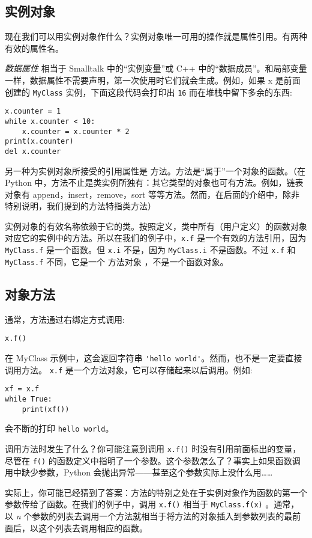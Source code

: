 \subsection{实例对象}
现在我们可以用实例对象作什么？实例对象唯一可用的操作就是属性引用。有两种有效的属性名。

\textit{数据属性} 相当于 Smalltalk 中的“实例变量”或 C++ 中的“数据成员”。和局部变量一样，数据属性不需要声明，第一次使用时它们就会生成。例如，如果 x 是前面创建的 \texttt{MyClass} 实例，下面这段代码会打印出 \verb|16| 而在堆栈中留下多余的东西:
\begin{lstlisting}
x.counter = 1
while x.counter < 10:
    x.counter = x.counter * 2
print(x.counter)
del x.counter
\end{lstlisting}
另一种为实例对象所接受的引用属性是 方法。方法是“属于”一个对象的函数。（在 Python 中，方法不止是类实例所独有：其它类型的对象也可有方法。例如，链表对象有 append，insert，remove，sort 等等方法。然而，在后面的介绍中，除非特别说明，我们提到的方法特指类方法）

实例对象的有效名称依赖于它的类。按照定义，类中所有（用户定义）的函数对象对应它的实例中的方法。所以在我们的例子中，\texttt{x.f} 是一个有效的方法引用，因为 \texttt{MyClass.f} 是一个函数。但 \texttt{x.i} 不是，因为 \texttt{MyClass.i} 不是函数。不过 \texttt{x.f} 和 \texttt{MyClass.f} 不同，它是一个 方法对象 ，不是一个函数对象。
\subsection{对象方法}
通常，方法通过右绑定方式调用:
\begin{lstlisting}
x.f()
\end{lstlisting}
在 MyClass 示例中，这会返回字符串 \verb|'hello world'|。然而，也不是一定要直接调用方法。 \texttt{x.f} 是一个方法对象，它可以存储起来以后调用。例如:
\begin{lstlisting}
xf = x.f
while True:
    print(xf())
\end{lstlisting}
会不断的打印 \verb|hello world|。

调用方法时发生了什么？你可能注意到调用 \texttt{x.f()} 时没有引用前面标出的变量，尽管在 \texttt{f()} 的函数定义中指明了一个参数。这个参数怎么了？事实上如果函数调用中缺少参数，Python 会抛出异常——甚至这个参数实际上没什么用……

实际上，你可能已经猜到了答案：方法的特别之处在于实例对象作为函数的第一个参数传给了函数。在我们的例子中，调用 \texttt{x.f()} 相当于 \texttt{MyClass.f(x)} 。通常，以 \textit{n} 个参数的列表去调用一个方法就相当于将方法的对象插入到参数列表的最前面后，以这个列表去调用相应的函数。


